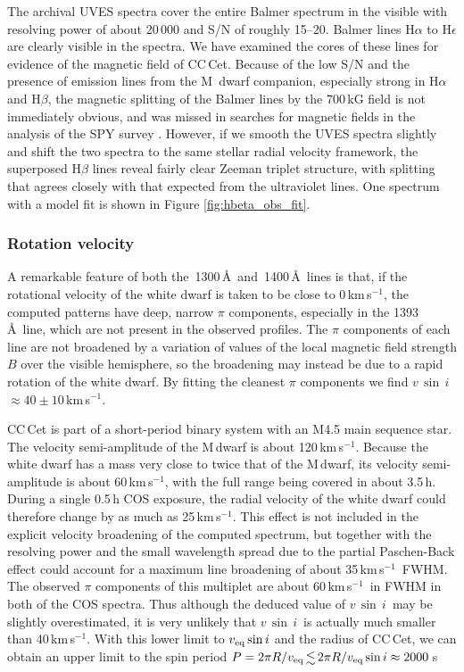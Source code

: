 \documentclass[fleqn,usenatbib]{mnras}
\newcommand{\vsini}{\ensuremath{v\,\sin\,i}}
\newcommand{\kms}{km\,s$^{-1}$}
\begin{document}
The archival UVES spectra cover the entire Balmer spectrum in the visible with resolving power of about 20\,000 and S/N of roughly 15--20. Balmer lines H$\alpha$ to H$\epsilon$ are clearly visible in the spectra. We have examined the cores of these lines for evidence of the magnetic field of CC\,Cet. Because of the low S/N and the presence of emission lines from the M~dwarf companion, especially strong in H$\alpha$ and H$\beta$, the magnetic splitting of the Balmer lines by the 700\,kG field is not immediately obvious, and was missed in searches for magnetic fields in the analysis of the SPY survey \citep{napiwotzkietal20-1, koesteretal09-2}. However, if we smooth the UVES spectra slightly and shift the two spectra to the same stellar radial velocity framework, the superposed H$\beta$ lines reveal fairly clear Zeeman triplet structure, with splitting that agrees closely with that expected from the ultraviolet lines. One spectrum with a model fit is shown in Figure \ref{fig:hbeta_obs_fit}.

\subsubsection{Rotation velocity}
\label{sec:rotation}

A remarkable feature of both the \,1300\,\AA\ and \,1400\,\AA\ lines is that, if the rotational velocity of the white dwarf is taken to be close to 0\,\kms, the computed patterns have deep, narrow $\pi$ components, especially in the 1393\,\AA\ line, which are not present in the observed profiles. The $\pi$ components of each line are not broadened by a variation of values of the local magnetic field strength $B$ over the visible hemisphere, so the broadening may instead be due to a rapid rotation of the white dwarf. By fitting the cleanest $\pi$ components we find \vsini$\approx 40 \pm 10$\,\kms.

CC\,Cet is part of a short-period binary system with an M4.5 main sequence star. The velocity semi-amplitude of the M\,dwarf is about 120\,\kms \citep{safferetal93-1}. Because the white dwarf has a mass very close to twice that of the M\,dwarf, its velocity semi-amplitude is about 60\,\kms, with the full range being covered in about 3.5\,h. During a single 0.5\,h COS exposure, the radial velocity of the white dwarf could therefore change by as much as 25\,\kms. This effect is not included in the explicit velocity broadening of the computed spectrum, but together with the resolving power and the small wavelength spread due to the partial Paschen-Back effect could account for a maximum line broadening of about 35\,\kms\ FWHM. The observed $\pi$ components of this multiplet are about 60\,\kms\ in FWHM in both of the COS spectra. Thus although the deduced value of \vsini\ may be slightly overestimated, it is very unlikely that \vsini\ is actually much smaller than 40\,\kms. With this lower limit to $v_{\rm eq} \sin i$ and the radius of CC\,Cet, we can obtain an upper limit to the spin period $P = 2 \pi R/v_{\rm eq} \la 2 \pi R/v_{\rm eq} \sin i \approx 2000$\,s
\end{document}

